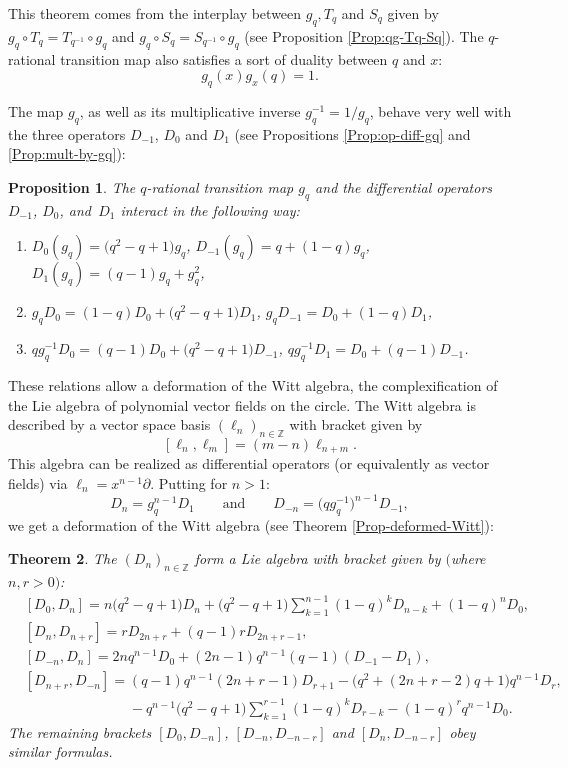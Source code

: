 \documentclass[pdftex]{sigma}
\numberwithin{equation}{section}
\newtheorem{Theorem}{Theorem}[section]
\newtheorem{Proposition}[Theorem]{Proposition}
 { \theoremstyle{definition}
\newtheorem{Definition}[Theorem]{Definition}
\newtheorem{Note}[Theorem]{Note}
\newtheorem{Example}[Theorem]{Example}
\newtheorem{Remark}[Theorem]{Remark} }
\newcommand*{\Z}{\mathbb{Z}}
\begin{document}
This theorem comes from the interplay between $g_q, T_q$ and $S_q$ given by $g_q\circ T_q=T_{q^{-1}}\circ g_q$ and $g_q\circ S_q=S_{q^{-1}}\circ g_q$ (see Proposition \ref{Prop:qg-Tq-Sq}). The $q$-rational transition map also satisfies a sort of duality between $q$ and $x$:
\[g_q(x)g_x(q)=1.
\]

The map $g_q$, as well as its multiplicative inverse $g_q^{-1}=1/g_q$, behave very well with the three operators $D_{-1}$, $D_0$ and $D_1$ (see Propositions \ref{Prop:op-diff-gq} and \ref{Prop:mult-by-gq}):

\begin{Proposition}
The $q$-rational transition map $g_q$ and the differential operators $D_{-1}$, $D_0$, and~$D_1$ interact in the following way:
\begin{enumerate}\itemsep=0pt
\item[$(1)$] $D_0(g_q) = \big(q^2-q+1\big)g_q$, $D_{-1}(g_q) = q+(1-q)g_q$, $D_1(g_q) = (q-1)g_q+g_q^2$,
\item[$(2)$] $g_qD_0 = (1-q)D_0+\big(q^2-q+1\big)D_1$, $g_qD_{-1}= D_0+(1-q)D_1$,
\item[$(3)$] $qg_q^{-1}D_0 = (q-1)D_0+\big(q^2-q+1\big)D_{-1}$, $qg_q^{-1}D_{1}= D_0+(q-1)D_{-1}$.
\end{enumerate}
\end{Proposition}

These relations allow a deformation of the Witt algebra, the complexification of the Lie algebra of polynomial vector fields on the circle. The Witt algebra is described by a vector space basis $(\ell_n)_{n\in\Z}$ with bracket given by
\[
[\ell_n,\ell_m]=(m-n)\ell_{n+m}.
\]
This algebra can be realized as differential operators (or equivalently as vector fields) via ${\ell_n=x^{n-1}\partial}$.
Putting for $n>1$:
\[
D_n = g_q^{n-1}D_1 \qquad \text{and}\qquad D_{-n} = \big(qg_q^{-1}\big)^{n-1}D_{-1},
\]
we get a deformation of the Witt algebra (see Theorem \ref{Prop-deformed-Witt}):
\begin{Theorem}
The $(D_n)_{n\in\mathbb{Z}}$ form a Lie algebra with bracket given by $($where $n,r >0)$:
\begin{align*}
&[D_0,D_n]= n\big(q^2-q+1\big)D_n+\big(q^2-q+1\big)\displaystyle\sum_{k=1}^{n-1}(1-q)^kD_{n-k} + (1-q)^nD_0, \\
&[D_n,D_{n+r}]=rD_{2n+r}+(q-1)rD_{2n+r-1},\\
&[D_{-n},D_n]= 2nq^{n-1}D_0+(2n-1)q^{n-1}(q-1)(D_{-1}-D_1),\\
&[D_{n+r},D_{-n}]= (q-1)q^{n-1}(2n+r-1)D_{r+1}-\big(q^2+(2n+r-2)q+1\big)q^{n-1}D_r,\\
&\phantom{[D_{n+r},D_{-n}]=}{} -q^{n-1}\big(q^2-q+1\big)\displaystyle\sum_{k=1}^{r-1}(1-q)^kD_{r-k}-(1-q)^rq^{n-1}D_0.
\end{align*}
The remaining brackets $[D_0,D_{-n}]$, $[D_{-n},D_{-n-r}]$ and $[D_n,D_{-n-r}]$ obey similar formulas.
\end{Theorem}
\end{document}
